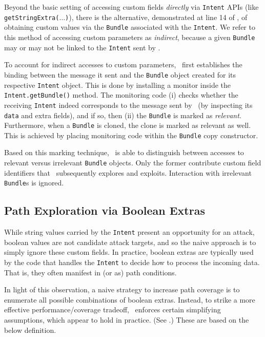 Beyond the basic setting of accessing custom fields \emph{directly} via {\tt Intent} APIs (like {\tt getStringExtra($\ldots$)}), there is the alternative, demonstrated at line 14 of , of obtaining custom values via the {\tt Bundle} associated with the {\tt Intent}. We refer to this method of accessing custom parameters as \emph{indirect}, because a given {\tt Bundle} may or may not be linked to the {\tt Intent} sent by \Tool.

To account for indirect accesses to custom parameters, \Tool\ first establishes the binding between the message it sent and the {\tt Bundle} object created for its respective {\tt Intent} object. This is done by installing a monitor inside the {\tt Intent.getBundle()} method. The monitoring code (i) checks whether the receiving {\tt Intent} indeed corresponds to the message sent by \Tool\ (by inspecting its {\tt data} and extra fields), and if so, then (ii) the {\tt Bundle} is marked as \emph{relevant}. Furthermore, when a {\tt Bundle} is cloned, the clone is marked as relevant as well. This is achieved by placing monitoring code within the {\tt Bundle} copy constructor.

Based on this marking technique, \Tool\ is able to distinguish between accesses to relevant versus irrelevant {\tt Bundle} objects. Only the former contribute custom field identifiers that \Tool\ subsequently explores and exploits. Interaction with irrelevant {\tt Bundle}s is ignored.

\subsection{Path Exploration via Boolean Extras}

While string values carried by the {\tt Intent} present an opportunity for an attack, boolean values are not candidate attack targets, and so the naive approach is to simply ignore these custom fields. In practice, boolean extras are typically used by the code that handles the {\tt Intent} to decide how to process the incoming data. That is, they often manifest in (or as) path conditions.

In light of this observation, a naive strategy to increase path coverage is to enumerate all possible combinations of boolean extras. Instead, to strike a more effective performance/coverage tradeoff, \Tool\ enforces certain simplifying assumptions, which appear to hold in practice. (See .) These are based on the below definition.

